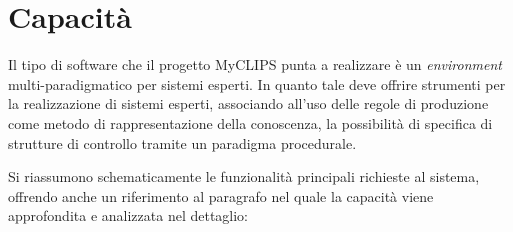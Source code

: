 %

\section{Capacità}

Il tipo di software che il progetto MyCLIPS punta a realizzare è un \emph{environment} multi-paradigmatico per sistemi esperti. In quanto tale deve offrire strumenti per la realizzazione di sistemi esperti, associando all'uso delle regole di produzione come metodo di rappresentazione della conoscenza, la possibilità di specifica di strutture di controllo tramite un paradigma procedurale.


Si riassumono schematicamente le funzionalità principali richieste al sistema, offrendo anche un riferimento al paragrafo nel quale la capacità viene approfondita e analizzata nel dettaglio:

